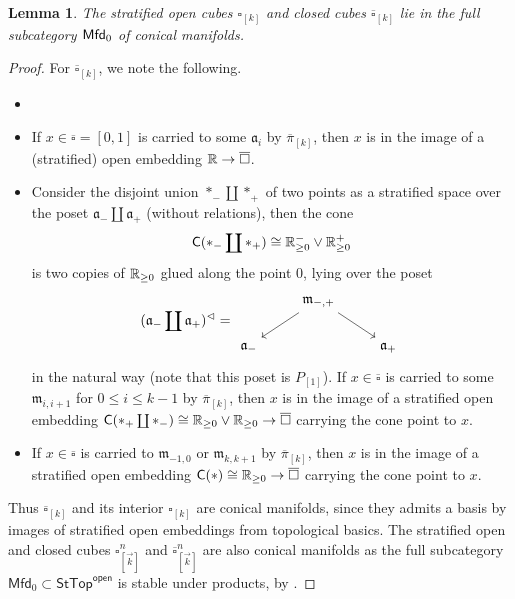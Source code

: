 \documentclass[10pt, reqno, twoside
, final
]{amsart}
\numberwithin{equation}{subsection}%
\theoremstyle{definition}
\theoremstyle{definition}
\theoremstyle{definition}
\theoremstyle{definition}
\theoremstyle{definition}
\theoremstyle{definition}
\theoremstyle{definition}
\theoremstyle{definition}
\theoremstyle{definition}
\theoremstyle{plain}
\theoremstyle{definition}
\theoremstyle{plain}
\theoremstyle{definition}
\theoremstyle{plain}
\theoremstyle{definition}
\theoremstyle{definition}
\theoremstyle{plain}
\newtheorem{lem}[defn]{Lemma}
\theoremstyle{plain}
\theoremstyle{definition}
\theoremstyle{plain}
\theoremstyle{plain}
\theoremstyle{plain}
\begin{document}
\begin{lem}\label{lem:cubesconicalmfd}
The stratified open cubes $\square_{[k]}$ and closed cubes $\overline{\square}_{[k]}$ lie in the full subcategory $\mathsf{Mfd}_0$ of conical manifolds.
\end{lem}
\begin{proof}
For $\overline{\square}_{[k]}$, we note the following.
\begin{itemize}
\item[]
    \item If $x\in \overline{\square}=[0,1]$ is carried to some $\mathfrak{a}_i$ by $\overline{\pi}_{[k]}$, then $x$ is in the image of a (stratified) open embedding $\mathbb{R}\rightarrow \overline{\square}$.
    \item Consider the disjoint union $*_-\coprod *_+$ of two points as a stratified space over the poset $\mathfrak{a}_-\coprod \mathfrak{a}_+$ (without relations), then the cone \[\mathsf{C}(*_-\coprod *_+) \cong \mathbb{R}^-_{\geq 0} \vee\mathbb{R}^+_{\geq 0}\] 
    is two copies of $\mathbb{R}_{\geq 0}$ glued along the point $0$, lying over the poset 
    \[ (\mathfrak{a}_-\coprod \mathfrak{a}_+)^{\lhd}=\begin{tikzcd}
        & \mathfrak{m}_{-,+} \ar[dr] \ar[dl] \\
        \mathfrak{a}_- && \mathfrak{a}_+
    \end{tikzcd} \]
    in the natural way (note that this poset is $P_{[1]}$). If $x\in \overline{\square}$ is carried to some $\mathfrak{m}_{i,i+1}$ for $0\leq i\leq k-1$ by $\overline{\pi}_{[k]}$, then $x$ is in the image of a stratified open embedding $\mathsf{C}(*_+\coprod *_-)\cong \mathbb{R}_{\geq 0}\vee \mathbb{R}_{\geq 0}\rightarrow \overline{\square}$ carrying the cone point to $x$.
    \item If $x\in \overline{\square}$ is carried to  $\mathfrak{m}_{-1,0}$ or $\mathfrak{m}_{k,k+1}$ by $\overline{\pi}_{[k]}$, then $x$ is in the image of a stratified open embedding $\mathsf{C}(*)\cong \mathbb{R}_{\geq 0}\rightarrow \overline{\square}$ carrying the cone point to $x$.
\end{itemize}
Thus $\overline{\square}_{[k]}$ and its interior ${\square}_{[k]}$ are conical manifolds, since they admits a basis by images of stratified open embeddings from topological basics. The stratified open and closed cubes $\square^n_{[\vec{k}]}$ and $\overline{\square}^n_{[\vec{k}]}$ are also conical manifolds as the full subcategory $\mathsf{Mfd}_0\subset \mathsf{StTop}^{\mathsf{open}}$ is stable under products, by \cite[Corollary 3.4.10]{AFT-local-structures}.
\end{proof}
\end{document}
